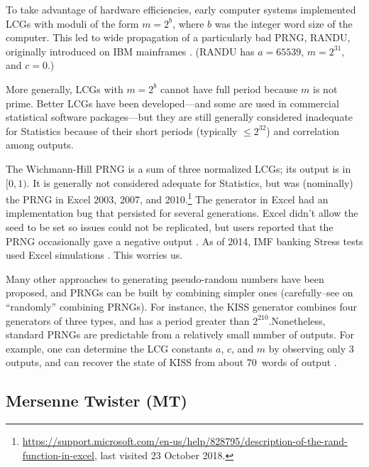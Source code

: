 \documentclass[graybox]{svmult}
\begin{document}
To take advantage of hardware efficiencies, early computer systems implemented LCGs 
with moduli of the form 
$m = 2^b$, where
$b$ was the integer word size of the computer.
This led to wide propagation of a particularly bad PRNG, RANDU, originally introduced
on IBM mainframes \cite{knuth_art_1997,markowsky14}.
(RANDU has $a=65539$, $m=2^{31}$, and $c=0$.)

More generally, LCGs with $m=2^b$ cannot have full period because $m$ is not prime. 
Better LCGs have been developed---and some are used in commercial statistical software packages---but they are still
generally considered inadequate for Statistics because of their short periods (typically $ \le 2^{32}$) 
and correlation among outputs.

The Wichmann-Hill PRNG is a sum of three normalized LCGs; its output is in $[0, 1)$.
%
It is generally not considered adequate for Statistics, but was (nominally) the PRNG in Excel 
2003, 2007, and 2010.\footnote{%
\url{https://support.microsoft.com/en-us/help/828795/description-of-the-rand-function-in-excel}, last visited 23 October 2018.}
The generator in Excel had an implementation bug that persisted for several generations.
Excel didn't allow the seed to be set so issues could not be replicated, but users reported that the PRNG occasionally gave a negative output \cite{mccullough_microsoft_2008}.
As of 2014, IMF banking Stress tests used Excel simulations \cite{ong14}.
This worries us.

Many other approaches to generating pseudo-random numbers have been
proposed, and PRNGs can be built by combining simpler ones (carefully--see \cite{knuth_art_1997} on ``randomly'' combining PRNGs).
For instance, the KISS generator combines four generators of three types, and has a period greater than $2^{210}$.Nonetheless, standard PRNGs are predictable from a relatively small number of outputs.
For example, one can determine the LCG constants $a$, $c$, and $m$ by observing only 3 outputs,
and can recover the state of KISS from about 70~words of output \cite{rose11}.


\subsection{Mersenne Twister (MT)}
\end{document}
